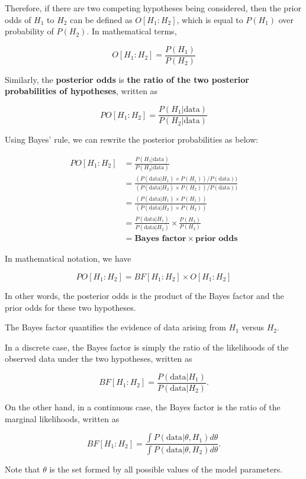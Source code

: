 \documentclass[]{book}
\theoremstyle{definition}
\theoremstyle{definition}
\theoremstyle{definition}
\theoremstyle{remark}
\begin{document}
Therefore, if there are two competing hypotheses being considered, then
the prior odds of \(H_1\) to \(H_2\) can be defined as \(O[H_1:H_2]\),
which is equal to \(P(H_1)\) over probability of \(P(H_2)\). In
mathematical terms,

\[O[H_1:H_2] = \frac{P(H_1)}{P(H_2)}\]

Similarly, the \textbf{posterior odds} is \textbf{the ratio of the two
posterior probabilities of hypotheses}, written as

\[PO[H_1:H_2] = \frac{P(H_1|\text{data})}{P(H_2|\text{data})}\]

Using Bayes' rule, we can rewrite the posterior probabilities as below:

\[\begin{aligned}
PO[H_1:H_2] &= \frac{P(H_1|\text{data})}{P(H_2|\text{data})} \\
&= \frac{(P(\text{data}|H_1) \times P(H_1)) / P(\text{data}))}{(P(\text{data}|H_2) \times P(H_2)) / P(\text{data}))} \\
&= \frac{(P(\text{data}|H_1) \times P(H_1))}{(P(\text{data}|H_2) \times P(H_2))} \\
&= \boxed{\frac{P(\text{data}|H_1)}{P(\text{data}|H_2)}} \times \boxed{\frac{P(H_1)}{P(H_2)}} \\
&= \textbf{Bayes factor} \times \textbf{prior odds}
\end{aligned}\]

In mathematical notation, we have

\[PO[H_1:H_2] = BF[H_1:H_2] \times O[H_1:H_2]\]

In other words, the posterior odds is the product of the Bayes factor
and the prior odds for these two hypotheses.

The Bayes factor quantifies the evidence of data arising from \(H_1\)
versus \(H_2\).

In a discrete case, the Bayes factor is simply the ratio of the
likelihoods of the observed data under the two hypotheses, written as

\[BF[H_1:H_2] = \frac{P(\text{data}|H_1)}{P(\text{data}|H_2)}.\]

On the other hand, in a continuous case, the Bayes factor is the ratio
of the marginal likelihoods, written as

\[BF[H_1:H_2] = \frac{\int P(\text{data}|\theta,H_1)d\theta}{\int P(\text{data}|\theta,H_2)d\theta}.\]

Note that \(\theta\) is the set formed by all possible values of the
model parameters.
\end{document}
